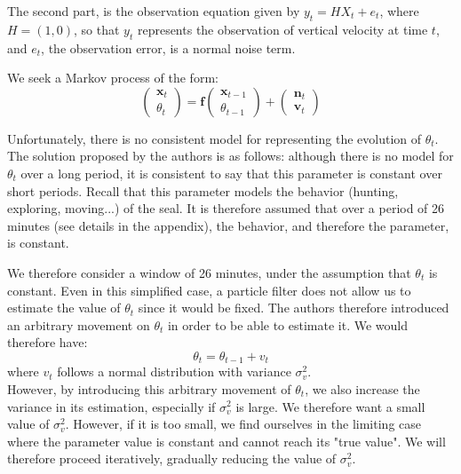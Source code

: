 The second part, is the observation equation given by $y_t = HX_t + e_t$, where $H = (1, 0)$, so that $y_t$ represents the observation of vertical velocity at time $t$, and $e_t$, the observation error, is a normal noise term.

We seek a Markov process of the form:
\begin{equation}
\begin{pmatrix}
\mathbf{x}_t\\\theta_t
\end{pmatrix}
=
\mathbf{f}\begin{pmatrix}
\mathbf{x}_{t-1}\\\theta_{t-1}
\end{pmatrix}
+
\begin{pmatrix}
\mathbf{n}_t \\\mathbf{v}_t
\end{pmatrix}
\end{equation}

Unfortunately, there is no consistent model for representing the evolution of $\theta_t$. The solution proposed by the authors is as follows: although there is no model for $\theta_t$ over a long period, it is consistent to say that this parameter is constant over short periods. Recall that this parameter models the behavior (hunting, exploring, moving...) of the seal. It is therefore assumed that over a period of 26 minutes (see details in the appendix), the behavior, and therefore the parameter, is constant.

We therefore consider a window of 26 minutes, under the assumption that $\theta_t$ is constant. Even in this simplified case, a particle filter does not allow us to estimate the value of $\theta_t$ since it would be fixed. The authors therefore introduced an arbitrary movement on $\theta_t$ in order to be able to estimate it. We would therefore have:
$$
\theta_t = \theta_{t-1} + v_t
$$
where $v_t$ follows a normal distribution with variance $\sigma_v^2$.\\


However, by introducing this arbitrary movement of $\theta_t$, we also increase the variance in its estimation, especially if $\sigma_v^2$ is large. We therefore want a small value of $\sigma_v^2$. However, if it is too small, we find ourselves in the limiting case where the parameter value is constant and cannot reach its "true value".
We will therefore proceed iteratively, gradually reducing the value of $\sigma_v^2$.\\

